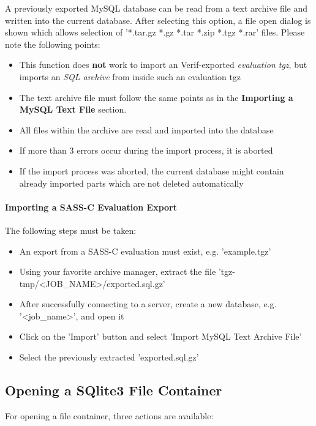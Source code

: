 A previously exported MySQL database can be read from a text archive file and written into the current database. After selecting this option, a file open dialog is shown which allows selection of '*.tar.gz *.gz *.tar *.zip *.tgz *.rar' files. Please note the following points:

\begin{itemize}  
\item This function does \textbf{not} work to import an Verif-exported \textit{evaluation tgz}, but imports an \textit{SQL archive} from inside such an evaluation tgz
\item The text archive file must follow the same points as in the \textbf{Importing a MySQL Text File} section.
\item All files within the archive are read and imported into the database
\item If more than 3 errors occur during the import process, it is aborted
\item If the import process was aborted, the current database might contain already imported parts which are not deleted automatically
\end{itemize}

\paragraph{Importing a SASS-C Evaluation Export}

The following steps must be taken:

\begin{itemize}  
\item An export from a SASS-C evaluation must exist, e.g. 'example.tgz'
\item Using your favorite archive manager, extract the file 'tgz-tmp/<JOB\_NAME>/exported.sql.gz'
\item After successfully connecting to a server, create a new database, e.g. '<job\_name>', and open it
\item Click on the 'Import' button and select 'Import MySQL Text Archive File'
\item Select the previously extracted 'exported.sql.gz'
\end{itemize}

\subsection{Opening a SQlite3 File Container}
\label{sec:sqlite_fc}
For opening a file container, three actions are available:

